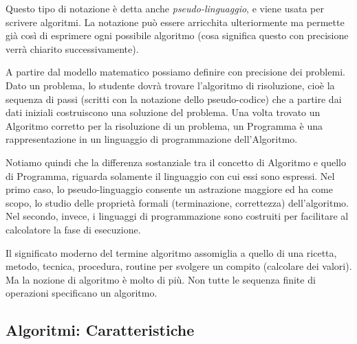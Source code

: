 Questo tipo di notazione è detta anche \emph{pseudo-linguaggio}, e viene usata per scrivere algoritmi. La notazione può essere arricchita ulteriormente ma permette già così di esprimere ogni possibile algoritmo (cosa significa questo con precisione verrà chiarito successivamente).

A partire dal modello matematico possiamo definire con precisione dei problemi.  Dato un problema, lo studente dovrà trovare l'algoritmo di risoluzione, cioè la sequenza di passi (scritti con la notazione dello pseudo-codice) che a partire dai dati iniziali costruiscono una soluzione del problema. Una volta trovato un Algoritmo corretto per la risoluzione di un problema, un Programma è una rappresentazione in un linguaggio di programmazione dell'Algoritmo.

Notiamo quindi che la differenza sostanziale tra il concetto di Algoritmo e quello di Programma, riguarda solamente il linguaggio con cui essi sono espressi.  Nel primo caso, lo pseudo-linguaggio consente un astrazione maggiore ed ha come scopo, lo studio delle proprietà formali (terminazione, correttezza) dell'algoritmo. Nel secondo, invece, i linguaggi di programmazione sono costruiti per facilitare al calcolatore la fase di esecuzione.

Il significato moderno del termine algoritmo assomiglia a quello di una ricetta, metodo, tecnica, procedura, routine per svolgere un compito (calcolare dei valori). Ma la nozione di algoritmo è molto di più. Non tutte le sequenza finite di operazioni specificano un algoritmo.

\subsection{Algoritmi: Caratteristiche}

